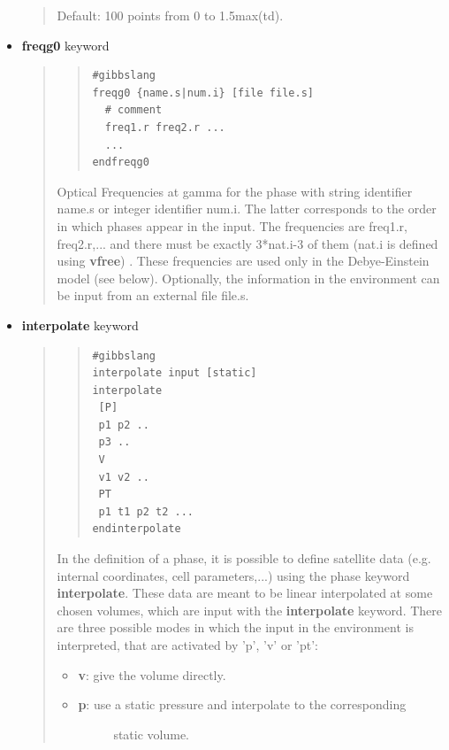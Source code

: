 \documentclass[a4paper]{article}
\begin{document}
\begin{itemize}
\begin{quote}
Default: 100 points from 0 to 1.5max(td).
\end{quote}

\item \textbf{freqg0} keyword

\begin{quote}
\begin{quote}
\begin{verbatim}
#gibbslang
freqg0 {name.s|num.i} [file file.s]
  # comment
  freq1.r freq2.r ...
  ...
endfreqg0
\end{verbatim}
\end{quote}

Optical Frequencies at gamma for the phase with string identifier
name.s or integer identifier num.i. The latter corresponds to the
order in which phases appear in the input. The frequencies are
freq1.r, freq2.r,... and there must be exactly 3*nat.i-3 of
them (nat.i is defined using \textbf{vfree}) . These frequencies are
used only in the Debye-Einstein model (see below). Optionally, the
information in the environment can be input from an external file
file.s.
\end{quote}

\item \textbf{interpolate} keyword

\begin{quote}
\begin{quote}
\begin{verbatim}
#gibbslang
interpolate input [static]
interpolate
 [P]
 p1 p2 ..
 p3 ..
 V
 v1 v2 ..
 PT
 p1 t1 p2 t2 ...
endinterpolate
\end{verbatim}
\end{quote}

In the definition of a phase, it is possible to define satellite
data (e.g. internal coordinates, cell parameters,...) using the
phase keyword \textbf{interpolate}. These data are meant to be
linear interpolated at some chosen volumes, which are input with
the \textbf{interpolate} keyword. There are three possible modes in
which the input in the environment is interpreted, that are
activated by 'p', 'v' or 'pt':

\begin{itemize}
\item \textbf{v}: give the volume directly.

\item 
\begin{description}
\item[{\textbf{p}: use a static pressure and interpolate to the corresponding}] \leavevmode 
static volume.


\end{description}
\end{itemize}
\end{quote}
\end{itemize}
\end{document}
